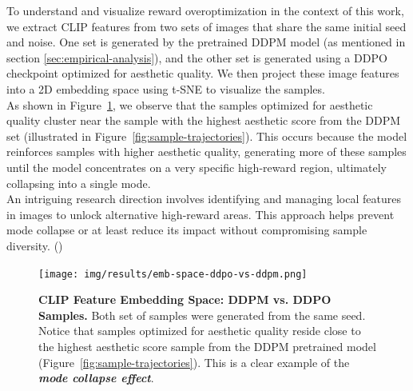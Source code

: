 \noindent To understand and visualize reward overoptimization in the context of this work, we extract CLIP \cite{radford2021learning} features from two sets of images that share the
same initial seed and noise. One set is generated by the pretrained DDPM model (as mentioned in section \ref{sec:empirical-analysis}), and the other set is generated using a DDPO checkpoint optimized for aesthetic quality. We then  project these image features into a 2D embedding space using t-SNE \cite{van2008visualizing} to visualize the samples. \\

\noindent As shown in Figure~\ref{fig:clip-emb-ddpo-vs-ddpm}, we observe that the samples optimized for aesthetic quality cluster near the sample with the highest aesthetic score from the DDPM set (illustrated in Figure~\ref{fig:sample-trajectories}). This occurs because the model reinforces samples with higher aesthetic quality, generating more of these samples until the
model concentrates on a very specific high-reward region, ultimately collapsing into a single mode. \\

\noindent An intriguing research direction involves identifying and managing local features in images to unlock alternative high-reward areas. This approach helps prevent mode collapse or at least reduce its impact without compromising sample diversity. () \\
\begin{figure}[ht]
  \centering
  \texttt{[image: img/results/emb-space-ddpo-vs-ddpm.png]}
  \vspace{-45pt}  %
    \captionsetup{width=\textwidth} %
    \caption{\textbf{CLIP Feature Embedding Space: DDPM vs. DDPO Samples.} Both set of samples were generated from the same seed. Notice that samples optimized for aesthetic quality reside close to the highest aesthetic score sample from the DDPM pretrained model (Figure~\ref{fig:sample-trajectories}). This is a clear example of the \textit{\textbf{mode collapse effect}}.}
    \label{fig:clip-emb-ddpo-vs-ddpm}
\end{figure}



